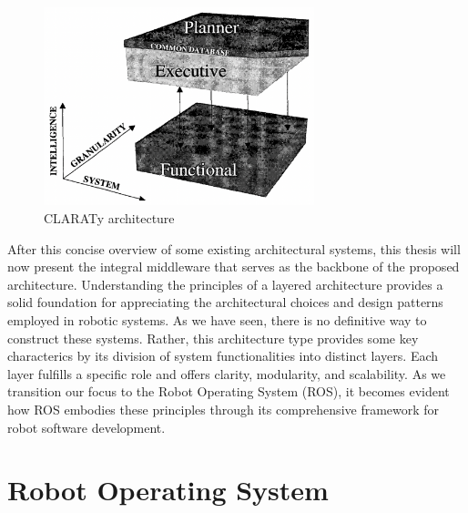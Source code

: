\documentclass[%
paper=A4,               %
twoside=true,           %
openright,              %
11pt,                   %
bibliography=totoc,     %
titlepage=on,           %
DIV=12,                 %
BCOR=1.5cm,             %
parskip=half,            %
final
]{scrreprt}
\begin{document}
	
	\begin{figure}[ht]
		\centering
		\includegraphics[width=0.7\textwidth]{Graphics/CLARATy}
		\caption{CLARATy architecture \autocite{volpeCLARAtyArchitectureRobotic2001} }
		\label{fig: fig4}
	\end{figure} 
	
	
	
	After this concise overview of some existing architectural systems, this thesis will now present the integral middleware that serves as the backbone of the proposed architecture.
	Understanding the principles of a layered architecture provides a solid foundation for appreciating the architectural choices and design patterns employed in robotic systems. As we have seen, there is no definitive way to construct these systems. Rather, this architecture type provides some key characterics by its division of system functionalities into distinct layers. Each layer fulfills a specific role and offers clarity, modularity, and scalability. As we transition our focus to the Robot Operating System (ROS), it becomes evident how ROS embodies these principles through its comprehensive framework for robot software development.
	
	
	
	\section{Robot Operating System}
\end{document}
